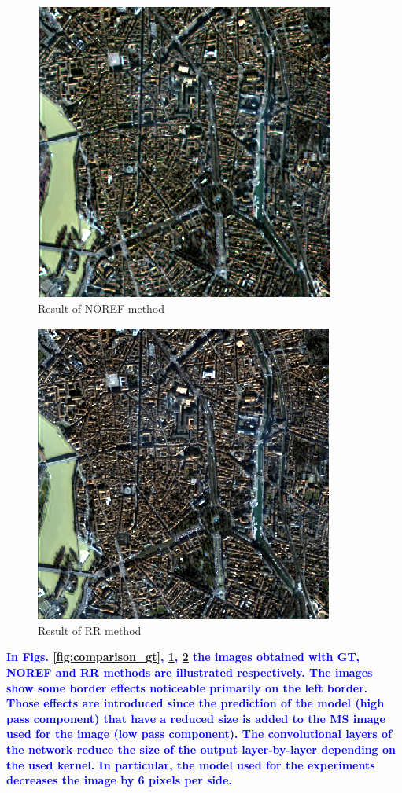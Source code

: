 \documentclass[12pt]{report}
\newcommand{\bb}[1]{\textcolor{blue}{\textbf{#1}}}
\begin{document}
\begin{figure}
    \centering
    \includegraphics[scale=.8]{NOREF.png}
    \caption{Result of NOREF method}
    \label{fig:comparison_noref}
\end{figure}

\begin{figure}
    \centering
    \includegraphics[scale=.8]{RR.png}
    \caption{Result of RR method}
    \label{fig:comparison_rr}
\end{figure}

\bb{In Figs. \ref{fig:comparison_gt}, \ref{fig:comparison_noref}, \ref{fig:comparison_rr} the images obtained with GT, NOREF and RR methods are illustrated respectively.
The images show some border effects noticeable primarily on the left border. Those effects are introduced since the prediction of the model (high pass component) that have a reduced size is added to the MS image used for the image (low pass component). 
The convolutional layers of the network reduce the size of the output layer-by-layer depending on the used kernel. In particular, the model used for the experiments decreases the image by 6 pixels per side.}
\end{document}

